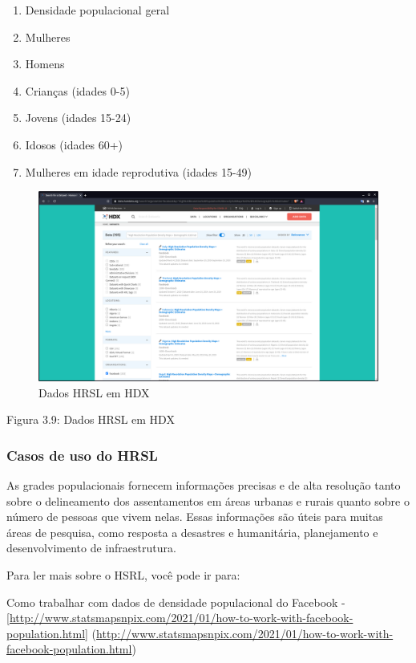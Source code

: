 \documentclass[
]{book}
\providecommand{\tightlist}{%
  \setlength{\itemsep}{0pt}\setlength{\parskip}{0pt}}
\begin{document}
\begin{enumerate}
\def\labelenumi{\arabic{enumi}.}
\tightlist
\item
  Densidade populacional geral
\item
  Mulheres
\item
  Homens
\item
  Crianças (idades 0-5)
\item
  Jovens (idades 15-24)
\item
  Idosos (idades 60+)
\item
  Mulheres em idade reprodutiva (idades 15-49)
\end{enumerate}

\begin{figure}
\centering
\includegraphics{media/modulo3/hdx.png}
\caption{Dados HRSL em HDX}
\end{figure}

Figura 3.9: Dados HRSL em HDX

\hypertarget{casos-de-uso-do-hrsl}{%
\subsubsection{\texorpdfstring{\textbf{Casos de uso do HRSL}}{Casos de uso do HRSL}}\label{casos-de-uso-do-hrsl}}

As grades populacionais fornecem informações precisas e de alta resolução tanto sobre o delineamento dos assentamentos em áreas urbanas e rurais quanto sobre o número de pessoas que vivem nelas. Essas informações são úteis para muitas áreas de pesquisa, como resposta a desastres e humanitária, planejamento e desenvolvimento de infraestrutura.

Para ler mais sobre o HSRL, você pode ir para:

Como trabalhar com dados de densidade populacional do Facebook - {[}\url{http://www.statsmapsnpix.com/2021/01/how-to-work-with-facebook-population.html}{]} (\url{http://www.statsmapsnpix.com/2021/01/how-to-work-with-facebook-population.html})
\end{document}
